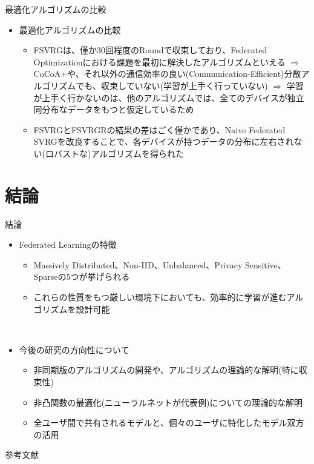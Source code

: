 \documentclass[dvipdfmx,notheorems,t]{beamer}
\begin{document}
\begin{frame}{最適化アルゴリズムの比較}

\begin{itemize}
	\item 最適化アルゴリズムの比較
	\begin{itemize}
		\item FSVRGは、僅か30回程度のRoundで収束しており、Federated Optimizationにおける課題を最初に解決したアルゴリズムといえる \newline \newline
		$\Rightarrow$ CoCoA+や、それ以外の通信効率の良い(Communication-Efficient)分散アルゴリズムでも、収束していない(学習が上手く行っていない) \newline \newline
		$\Rightarrow$ 学習が上手く行かないのは、他のアルゴリズムでは、全てのデバイスが独立同分布なデータをもつと仮定しているため
		\newline
		
		\item FSVRGとFSVRGRの結果の差はごく僅かであり、Naive Federated SVRGを改良することで、各デバイスが持つデータの分布に左右されない(ロバストな)アルゴリズムを得られた
	\end{itemize}
\end{itemize}

\end{frame}

\section{結論}

\begin{frame}{結論}

\begin{itemize}
	\item Federated Learningの特徴
	\begin{itemize}
		\item \alert{Massively Distributed}、\alert{Non-IID}、\alert{Unbalanced}、\alert{Privacy Sensitive}、\alert{Sparse}の5つが挙げられる
		\newline
		\item これらの性質をもつ厳しい環境下においても、効率的に学習が進むアルゴリズムを設計可能
	\end{itemize} \
	
	\item 今後の研究の方向性について
	\begin{itemize}
		\item 非同期版のアルゴリズムの開発や、アルゴリズムの理論的な解明(特に収束性)
		\item 非凸関数の最適化(ニューラルネットが代表例)についての理論的な解明
		\item 全ユーザ間で共有されるモデルと、個々のユーザに特化したモデル双方の活用
	\end{itemize}
\end{itemize}

\end{frame}

\begin{frame}{参考文献}




\end{frame}
\end{document}
